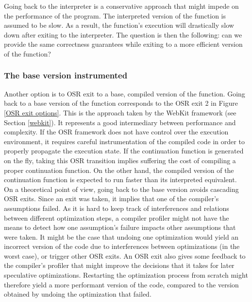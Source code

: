 Going back to the interpreter is a conservative approach that might impede on the performance of the program.
The interpreted version of the function is assumed to be slow.
As a result, the function's execution will drastically slow down after exiting to the interpreter.
The question is then the following: can we provide the same correctness guarantees while exiting to a more efficient version of the function?\\

\subsubsection{The base version instrumented}
Another option is to OSR exit to a base, compiled version of the function.
Going back to a base version of the function corresponds to the OSR exit 2 in Figure \ref{OSR exit options}.
This is the approach taken by the WebKit framework (see Section \ref{webkit}).
It represents a good intermediary between performance and complexity.
If the OSR framework does not have control over the execution environment, it requires careful instrumentation of the compiled code in order to properly propagate the execution state.
If the continuation function is generated on the fly, taking this OSR transition implies suffering the cost of compiling a proper continuation function.
On the other hand, the compiled version of the continuation function is expected to run faster than its interpreted equivalent.\\

On a theoretical point of view, going back to the base version avoids cascading OSR exits.
Since an exit was taken, it implies that one of the compiler's assumptions failed.
As it is hard to keep track of interferences and relations between different optimization steps, a compiler profiler might not have the means to detect how one assumption's failure impacts other assumptions that were taken.
It might be the case that undoing one optimization would yield an incorrect version of the code due to interferences between optimizations (in the worst case), or trigger other OSR exits.
An OSR exit also gives some feedback to the compiler's profiler that might improve the decisions that it takes for later speculative optimizations.
Restarting the optimization process from scratch might therefore yield a more performant version of the code, compared to the version obtained by undoing the optimization that failed.\\

